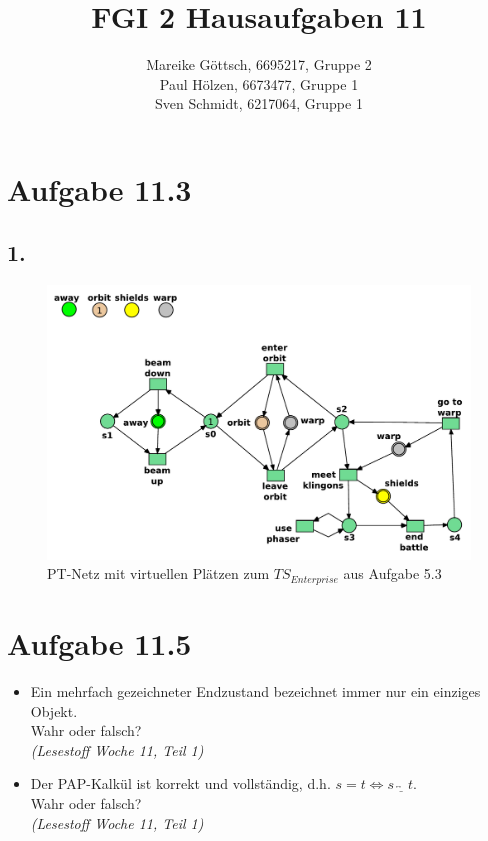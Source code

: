\documentclass[12pt, paper=a4]{article}
\author{Mareike G\"ottsch, 6695217, Gruppe 2\\Paul H\"olzen, 6673477, Gruppe 1\\Sven Schmidt, 6217064, Gruppe 1}
\title{FGI 2 Hausaufgaben 11}
\begin{document}
\maketitle

\section*{Aufgabe 11.3}
\subsection*{1.}

\begin{figure}[h!]
\centering
\includegraphics[scale=0.7]{EnterprisePT.pdf}
\caption{PT-Netz mit virtuellen Plätzen zum $TS_{Enterprise}$ aus Aufgabe 5.3}
\end{figure}

\section*{Aufgabe 11.5}
\begin{itemize}
	\item Ein mehrfach gezeichneter Endzustand bezeichnet immer nur ein einziges Objekt. \\
		Wahr oder falsch?\\
		\textit{(Lesestoff Woche 11, Teil 1)}
	\item Der PAP-Kalk\"ul ist korrekt und vollst\"andig, d.h. \(s = t \Leftrightarrow s \overleftrightarrow{\underline{\quad}} t\).\\
		Wahr oder falsch?\\
		\textit{(Lesestoff Woche 11, Teil 1)}
\end{itemize}
\end{document}
